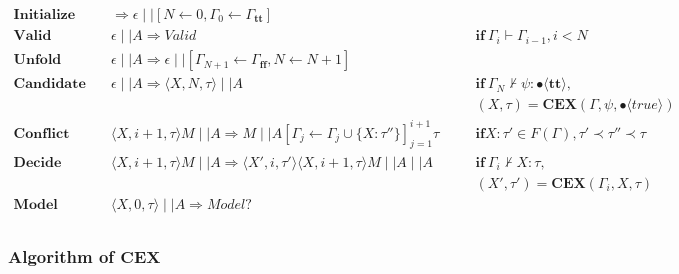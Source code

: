 \documentclass[runningheads]{llncs}
\newcommand\COL{\mathbin{:}}
\newcommand \true {\textbf{tt}}
\newcommand \false {\textbf{ff}}
\newcommand \stypebool {\bullet}
\newcommand \typebool[1]{\stypebool \langle #1 \rangle}
\begin{document}
\begin{align*}
    \textbf{Initialize} &\quad
        \Longrightarrow
        \epsilon \mid \mid [N \leftarrow 0, \Gamma_0 \leftarrow \Gamma_\true]
        &&\\
    \textbf{Valid} &\quad
        \epsilon \mid \mid A \Longrightarrow \textit{Valid}
        &&\quad \textbf{if} \ \Gamma_{i} \vdash \Gamma_{i-1}, i < N
        \\
    \textbf{Unfold} &\quad
        \epsilon \mid \mid A \Longrightarrow
        \epsilon \mid \mid [\Gamma_{N+1} \leftarrow \Gamma_\false, N \leftarrow N + 1]
        &&\\
    \textbf{Candidate} &\quad
        \epsilon \mid \mid A
        \Longrightarrow
        \langle X, N, \tau \rangle \mid \mid A
        && \quad \textbf{if} \ \Gamma_N \not \vdash \psi \COL
        \typebool{\true},\\
        &&&\quad (X, \tau) = \textbf{CEX}(\Gamma, \psi, \typebool{true})
        \\
    \textbf{Conflict} &\quad
        \langle X, i + 1, \tau \rangle M\mid \mid A
        \Longrightarrow
        M \mid \mid A[\Gamma_j \leftarrow \Gamma_j \cup \{X: \tau''\}]_{j=1}^{i+1}
        \tau
        &&\quad \textbf{if} X: \tau' \in F(\Gamma), \tau' \prec \tau''
        \prec \tau
        \\
    \textbf{Decide} &\quad
        \langle X, i + 1, \tau \rangle M\mid \mid A
        \Longrightarrow
        \langle X', i, \tau' \rangle \langle X, i + 1, \tau \rangle M\mid \mid A \mid \mid A
        &&\quad \textbf{if} \ \Gamma_i \not\vdash X \COL \tau,\\
        &&&\quad (X', \tau') = \textbf{CEX}(\Gamma_i, X, \tau)
        \\
    \textbf{Model} &\quad
        \langle X, 0, \tau \rangle \mid \mid A \Rightarrow Model?
        &&\\
\end{align*}


\subsubsection{Algorithm of \( \mathbf{CEX} \)}
\end{document}
